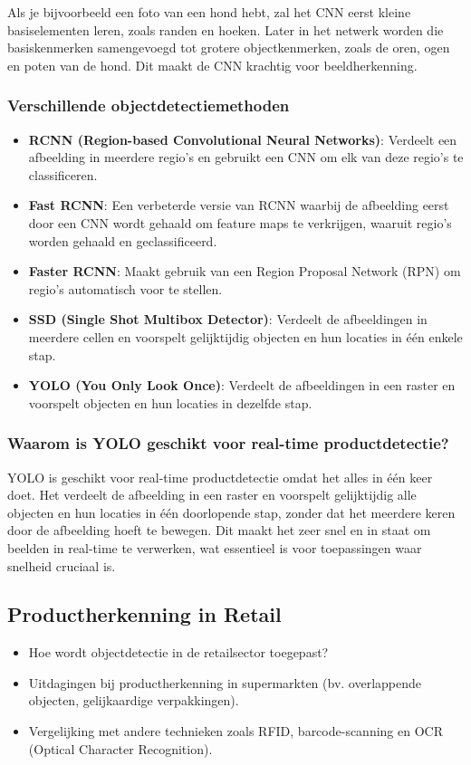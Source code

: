 Als je bijvoorbeeld een foto van een hond hebt, zal het CNN eerst kleine basiselementen leren, zoals randen en hoeken. Later in het netwerk worden die basiskenmerken samengevoegd tot grotere objectkenmerken, zoals de oren, ogen en poten van de hond. Dit maakt de CNN krachtig voor beeldherkenning.

\subsubsection{Verschillende objectdetectiemethoden}
\begin{itemize}
    \item \textbf{RCNN (Region-based Convolutional Neural Networks)}: Verdeelt een afbeelding in meerdere regio’s en gebruikt een CNN om elk van deze regio’s te classificeren.
    \item \textbf{Fast RCNN}: Een verbeterde versie van RCNN waarbij de afbeelding eerst door een CNN wordt gehaald om feature maps te verkrijgen, waaruit regio’s worden gehaald en geclassificeerd.
    \item \textbf{Faster RCNN}: Maakt gebruik van een Region Proposal Network (RPN) om regio’s automatisch voor te stellen.
    \item \textbf{SSD (Single Shot Multibox Detector)}: Verdeelt de afbeeldingen in meerdere cellen en voorspelt gelijktijdig objecten en hun locaties in één enkele stap.
    \item \textbf{YOLO (You Only Look Once)}: Verdeelt de afbeeldingen in een raster en voorspelt objecten en hun locaties in dezelfde stap.
\end{itemize}

\subsubsection{Waarom is YOLO geschikt voor real-time productdetectie?}
YOLO is geschikt voor real-time productdetectie omdat het alles in één keer doet. Het verdeelt de afbeelding in een raster en voorspelt gelijktijdig alle objecten en hun locaties in één doorlopende stap, zonder dat het meerdere keren door de afbeelding hoeft te bewegen. Dit maakt het zeer snel en in staat om beelden in real-time te verwerken, wat essentieel is voor toepassingen waar snelheid cruciaal is.

\subsection{Productherkenning in Retail}
\begin{itemize}
    \item Hoe wordt objectdetectie in de retailsector toegepast?
    \item Uitdagingen bij productherkenning in supermarkten (bv. overlappende objecten, gelijkaardige verpakkingen).
    \item Vergelijking met andere technieken zoals RFID, barcode-scanning en OCR (Optical Character Recognition).
\end{itemize}

